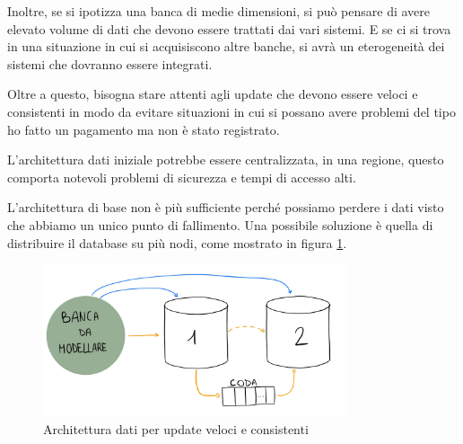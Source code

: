 Inoltre, se si ipotizza una banca di medie dimensioni, si può pensare di avere
elevato volume di dati che devono essere trattati dai vari sistemi. E se ci si 
trova in una situazione in cui si acquisiscono altre banche, si avrà un eterogeneità 
dei sistemi che dovranno essere integrati.

Oltre a questo, bisogna stare attenti agli update che devono essere veloci e 
consistenti in modo da evitare situazioni in cui si possano avere problemi del 
tipo ho fatto un pagamento ma non è stato registrato.  

L'architettura dati iniziale potrebbe essere centralizzata, in una regione,
questo comporta notevoli problemi di sicurezza e tempi di accesso alti.

L'architettura di base non è più sufficiente perché possiamo perdere i dati visto
che abbiamo un unico punto di fallimento. Una possibile soluzione è quella di 
distribuire il database su più nodi, come mostrato in figura \ref{fig:esBanca}.
\begin{figure}[!ht]
    \centering
    \includegraphics[width=0.8\textwidth]{./img/modellazione_banca.jpg}
    \caption{Architettura dati per update veloci e consistenti}
    \label{fig:esBanca}
\end{figure}

